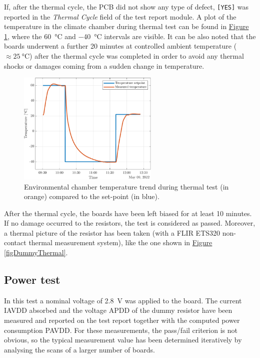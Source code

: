 \noindent
If, after the thermal cycle, the PCB did not show any type of defect, \texttt{[YES]} was reported in the \textit{Thermal Cycle} field of the test report module. A plot of the temperature in the climate chamber during thermal test can be found in \hyperref[figDUMMYtest]{Figure \ref{figDUMMYtemp}}, where the \SI{60}{\celsius} and \SI{-40}{\celsius} intervals are visible. It can be also noted that the boards underwent a further 20 minutes at controlled ambient temperature ($\approx\SI{25}{\celsius}$) after the thermal cycle was completed in order to avoid any thermal shocks or damages coming from a sudden change in temperature.

\begin{figure}[h!]
    \centering
    \includegraphics[width=0.6\textwidth]{Images/chap2/chamber_temperature.pdf}
    \caption{Environmental chamber temperature trend during thermal test (in orange) compared to the set-point (in blue).}
    \label{figDUMMYtemp}
\end{figure}

After the thermal cycle, the boards have been left biased for at least 10 minutes. If no damage occurred to the resistors, the test is considered as passed. Moreover, a thermal picture of the resistor has been taken (with a FLIR ETS320 non-contact thermal measurement system), like the one shown in \hyperref[figDummyThermal]{Figure \ref{figDummyThermal}}.


\subsection{Power test}
In this test a nominal voltage of \SI{2.8}{\volt} was applied to the board. The current IAVDD absorbed and the voltage APDD of the dummy resistor have been measured and reported on the test report together with the computed power consumption PAVDD. For these measurements, the pass/fail criterion is not obvious, so the typical measurement value has been determined iteratively by analysing the scans of a larger number of boards.

